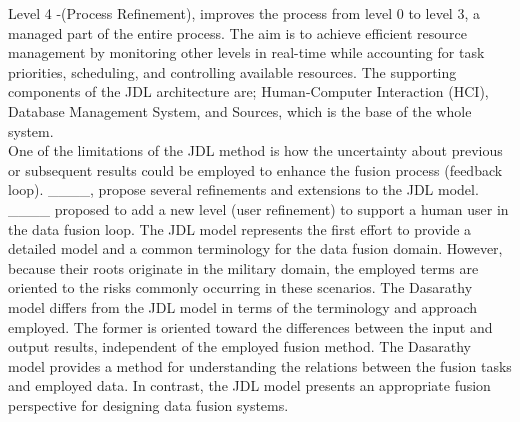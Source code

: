 Level 4 -(Process Refinement), improves the process from level 0 to level 3, a managed part of the entire process. The aim is to achieve efficient resource management by monitoring other levels in real-time while accounting for task priorities, scheduling, and controlling available resources. The supporting components of the JDL architecture are;
Human-Computer Interaction (HCI), %
Database Management System, %
 and Sources, which is the base of the whole system.\\ %
 
One of the limitations of the JDL method is how the uncertainty about previous or subsequent results could be employed to enhance the fusion process (feedback loop). ____, propose several refinements and extensions to the JDL model. ____ proposed to add a new level (user refinement) to support a human user in the data fusion loop. The JDL model represents the first effort to provide a detailed model and a common terminology for the data fusion domain. However, because their roots originate in the military domain, the employed terms are oriented to the risks commonly occurring in these scenarios.  
The Dasarathy model differs from the JDL model in terms of the terminology and approach employed. The former is oriented toward the differences between the input and output results, independent of the employed fusion method. The Dasarathy model provides a method for understanding the relations between the fusion tasks and employed data. In contrast, the JDL model presents an appropriate fusion perspective for designing data fusion systems. 
